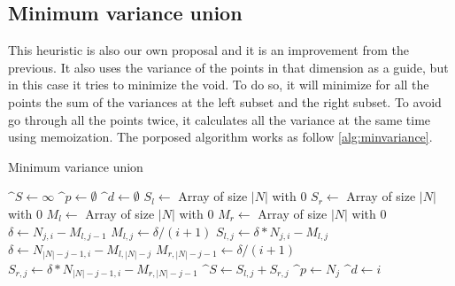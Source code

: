 \subsection{Minimum variance union}
This heuristic is also our own proposal and it is an improvement from the previous. It also uses the variance of the points in that dimension as a guide, but in this case it tries to minimize the void. To do so, it will minimize for all the points the sum of the variances at the left subset and the right subset. To avoid go through all the points twice, it calculates all the variance at the same time using memoization. The porposed algorithm works as follow \ref{alg:minvariance}.
\begin{algorithm}[h!]
    \caption{Minimum variance union
        \label{alg:minvariance}}
    \begin{algorithmic}[1]
    \Statex
        \State $\^{S} \gets \infty$
        \State $\^{p} \gets \emptyset$
        \State $\^{d} \gets \emptyset$
            \State {}
            \State $S_l \gets $ Array of size $|N|$ with $0$
            \State $S_r \gets $ Array of size $|N|$ with $0$
            \State $M_l \gets $ Array of size $|N|$ with $0$
            \State $M_r \gets $ Array of size $|N|$ with $0$
            \Statex
            \For{$j \in [1,|N|)$}
                \State $\delta \gets N_{j,i} - M_{l,j-1}$
                \State $M_{l,j} \gets \delta / (i+1)$
                \State $S_{l,j} \gets \delta *  N_{j,i} - M_{l,j}$ 
                \Statex
                \State $\delta \gets N_{|N|-j-1,i} - M_{l,|N|-j}$
                \State $M_{r,|N|-j-1} \gets \delta / (i+1)$
                \State $S_{r,j} \gets \delta *  N_{|N|-j-1,i} - M_{r,|N|-j-1}$ 
            \EndFor
            \For{$j \in [0,|N|)$}
                    \State $\^{S} \gets S_{l,j} + S_{r,j}$
                    \State $\^{p} \gets N_j$
                    \State $\^{d} \gets i$
                \EndIf
            \EndFor
        \EndFor
        \State {}
    \EndFunction
    \end{algorithmic}
\end{algorithm}

